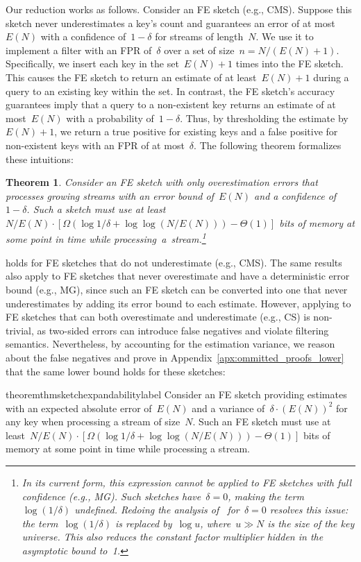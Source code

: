 \documentclass[sigconf]{acmart}
\newtheorem{theorem}{Theorem}[section]
\begin{document}
Our reduction works as follows.
Consider an FE sketch (e.g., CMS).
Suppose this sketch never underestimates a key's count and guarantees an error of at most~$E(N)$ with a confidence of~$1-\delta$ for streams of length~$N$.
We use it to implement a filter with an FPR of~$\delta$ over a set of size~$n=N/(E(N)+1)$.
Specifically, we insert each key in the set~$E(N)+1$ times into the FE sketch.
This causes the FE sketch to return an estimate of at least~$E(N)+1$ during a query to an existing key within the set.
In contrast, the FE sketch's accuracy guarantees imply that a query to a non-existent key returns an estimate of at most~$E(N)$ with a probability of~$1-\delta$.
Thus, by thresholding the estimate by~$E(N)+1$, we return a true positive for existing keys and a false positive for non-existent keys with an FPR of at most~$\delta$.
The following theorem formalizes these intuitions:
\begin{theorem}
    \label{thm:sketch_expandability_special_case}
    Consider an FE sketch with only overestimation errors that processes growing streams with an error bound of~$E(N)$ and a confidence of~$1-\delta$.
    Such a sketch must use at least~$N/E(N) \cdot [\Omega\left( \log 1/\delta + \log\log (N/E(N)) \right) - \Theta(1)]$ bits of memory at some point in time while processing~a~stream.\footnote{
        In its current form, this expression cannot be applied to FE sketches with full confidence (e.g., MG).
        Such sketches have~$\delta=0$, making the term~$\log(1/\delta)$ undefined.
        Redoing the analysis of~\cite{PaghExpandability} for~$\delta=0$ resolves this issue: the term~$\log(1/\delta)$ is replaced by~$\log u$, where~$u \gg N$ is the size of the key universe.
        This also reduces the constant factor multiplier hidden in the asymptotic bound to~1.
    }
\end{theorem}

 holds for FE sketches that do not underestimate (e.g., CMS).
The same results also apply to FE sketches that never overestimate and have a deterministic error bound (e.g., MG), since such an FE sketch can be converted into one that never underestimates by adding its error bound to each estimate.
However, applying  to FE sketches that can both overestimate and underestimate (e.g., CS) is non-trivial, as two-sided errors can introduce false negatives and violate filtering semantics.
Nevertheless, by accounting for the estimation variance, we reason about the false negatives and prove in Appendix~\ref{apx:ommitted_proofs_lower} that the same lower bound holds for these sketches:
\begin{restatable}{theorem}{thmsketchexpandabilitylabel}
    \label{thm:sketch_expandability}
    Consider an FE sketch providing estimates with an expected absolute error
    of~$E(N)$ and a variance of~$\delta \cdot (E(N))^2$ for any key when
    processing a stream of size~$N$. Such an FE sketch must use at
    least~$N/E(N) \cdot [\Omega(\log 1/\delta + \log\log (N/E(N))) -
    \Theta(1)]$ bits of memory at some point in time while processing a stream.
\end{restatable}
\end{document}
